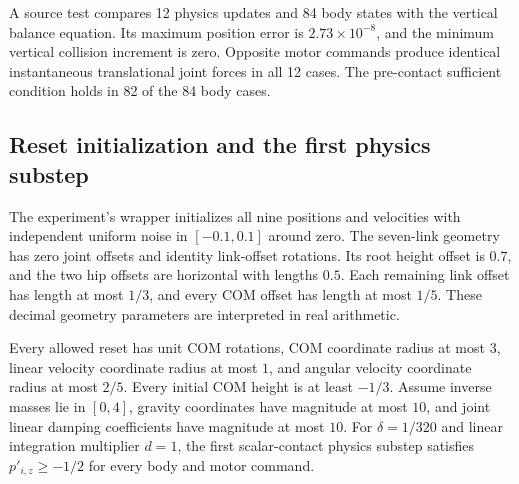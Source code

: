 A source test compares 12 physics updates and 84 body states with the vertical balance equation.
Its maximum position error is $2.73\times10^{-8}$, and the minimum vertical collision increment is zero.
Opposite motor commands produce identical instantaneous translational joint forces in all 12 cases.
The pre-contact sufficient condition holds in 82 of the 84 body cases.

\subsection{Reset initialization and the first physics substep}
\label{app:reset_step}

The experiment's wrapper initializes all nine positions and velocities with independent uniform noise in $[-0.1,0.1]$ around zero.
The seven-link geometry has zero joint offsets and identity link-offset rotations.
Its root height offset is $0.7$, and the two hip offsets are horizontal with lengths $0.5$.
Each remaining link offset has length at most $1/3$, and every COM offset has length at most $1/5$.
These decimal geometry parameters are interpreted in real arithmetic.

\begin{proposition}
\label{prop:reset_step}
Every allowed reset has unit COM rotations, COM coordinate radius at most $3$, linear velocity coordinate radius at most $1$, and angular velocity coordinate radius at most $2/5$.
Every initial COM height is at least $-1/3$.
Assume inverse masses lie in $[0,4]$, gravity coordinates have magnitude at most $10$, and joint linear damping coefficients have magnitude at most $10$.
For $\delta=1/320$ and linear integration multiplier $d=1$, the first scalar-contact physics substep satisfies $p'_{i,z}\ge-1/2$ for every body and motor command.
\end{proposition}

